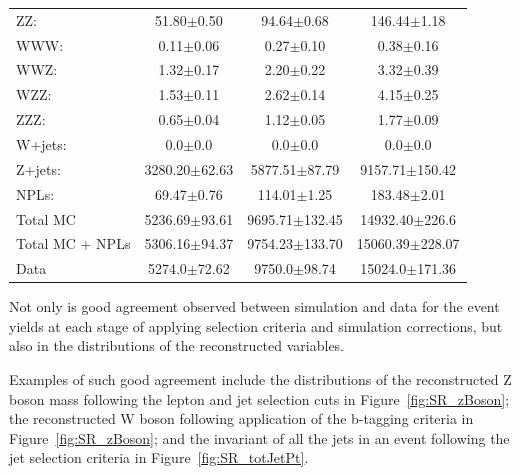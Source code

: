 \begin{table}[htbp]
\begin{tabular}{lccc}
ZZ\@: & 51.80$\pm$0.50 & 94.64$\pm$0.68 & 146.44$\pm$1.18    \\
WWW\@: & 0.11$\pm$0.06 & 0.27$\pm$0.10 & 0.38$\pm$0.16    \\
WWZ\@: & 1.32$\pm$0.17 & 2.20$\pm$0.22 & 3.32$\pm$0.39    \\
WZZ\@: & 1.53$\pm$0.11 & 2.62$\pm$0.14 & 4.15$\pm$0.25   \\
ZZZ\@: & 0.65$\pm$0.04 & 1.12$\pm$0.05 & 1.77$\pm$0.09    \\
W+jets: & 0.0$\pm$0.0 & 0.0$\pm$0.0 & 0.0$\pm$0.0    \\
Z+jets: & 3280.20$\pm$62.63 & 5877.51$\pm$87.79 & 9157.71$\pm$150.42    \\
\hline
NPLs: & 69.47$\pm$0.76 & 114.01$\pm$1.25 & 183.48$\pm$2.01   \\
\hline
Total MC & 5236.69$\pm$93.61 & 9695.71$\pm$132.45 & 14932.40$\pm$226.6    \\
Total MC + NPLs & 5306.16$\pm$94.37 & 9754.23$\pm$133.70 & 15060.39$\pm$228.07    \\
\hline
Data & 5274.0$\pm$72.62 & 9750.0$\pm$98.74 & 15024.0$\pm$171.36    \\
\hline
\end{tabular}
\end{table}

Not only is good agreement observed between simulation and data for the event yields at each stage of applying selection criteria and simulation corrections, but also in the distributions of the reconstructed variables.

Examples of such good agreement include the distributions of the reconstructed Z boson mass following the lepton and jet selection cuts in Figure~\ref{fig:SR_zBoson}; the reconstructed W boson following application of the b-tagging criteria in Figure~\ref{fig:SR_zBoson}; and the invariant \pT of all the jets in an event following the jet selection criteria in Figure~\ref{fig:SR_totJetPt}.

